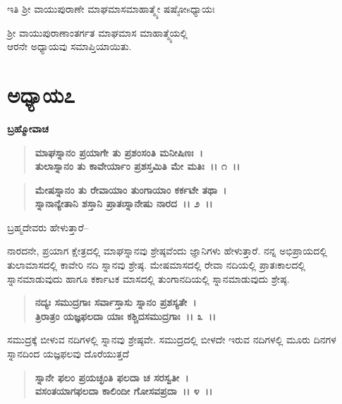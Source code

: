\begin{center}
ಇತಿ ಶ‍್ರೀ ವಾಯುಪುರಾಣೇ ಮಾಘಮಾಸಮಾಹಾತ್ಮ್ಯೇ ಷಷ್ಠೋsಧ್ಯಾಯಃ 
\end{center}

\begin{center}
ಶ‍್ರೀ ವಾಯುಪುರಾಣಾಂತರ್ಗತ ಮಾಘಮಾಸ ಮಾಹಾತ್ಮ್ಯೆಯಲ್ಲಿ \\ ಆರನೇ ಅಧ್ಯಾಯವು ಸಮಾಪ್ತಿಯಾಯಿತು.
\end{center}

\newpage

\section*{ಅಧ್ಯಾಯ೭}

\emptypage

\begin{flushleft}
\textbf{ಬ್ರಹ್ಮೋವಾಚ }
\end{flushleft}

\begin{verse}
\textbf{ಮಾಘಸ್ನಾನಂ ಪ್ರಯಾಗೇ ತು ಪ್ರಶಂಸಂತಿ ಮನೀಷಿಣಃ~।}\\\textbf{ತುಲಾಸ್ನಾನಂ ತು ಕಾವೇರ್ಯಾಂ ಪ್ರಶಸ್ತಮಿತಿ ಮೇ ಮತಿಃ~।। ೧~।। }
\end{verse}

\begin{verse}
\textbf{ಮೇಷಸ್ನಾನಂ ತು ರೇವಾಯಾಂ ತುಂಗಾಯಾಂ ಕರ್ಕಟೇ ತಥಾ~।}\\\textbf{ಸ್ನಾನಾನ್ಯೇತಾನಿ ಶಸ್ತಾನಿ ಪ್ರಾತಃಸ್ನಾನೇಷು ನಾರದ~।। ೨~।।}
\end{verse}

\begin{flushleft}
 ಬ್ರಹ್ಮದೇವರು ಹೇಳುತ್ತಾರೆ– 
\end{flushleft}

ನಾರದನೇ, ಪ್ರಯಾಗ ಕ್ಷೇತ್ರದಲ್ಲಿ ಮಾಘಸ್ನಾನವು ಶ್ರೇಷ್ಠವೆಂದು ಜ್ಞಾನಿಗಳು ಹೇಳುತ್ತಾರೆ. ನನ್ನ ಅಭಿಪ್ರಾಯದಲ್ಲಿ ತುಲಾಮಾಸದಲ್ಲಿ ಕಾವೇರಿ ನದಿ ಸ್ನಾನವು ಶ್ರೇಷ್ಠ. ಮೇಷಮಾಸದಲ್ಲಿ ರೇವಾ ನದಿಯಲ್ಲಿ ಪ್ರಾತಃಕಾಲದಲ್ಲಿ ಸ್ನಾನಮಾಡುವುದು ಹಾಗೂ ಕರ್ಕಾಟಕ ಮಾಸದಲ್ಲಿ ತುಂಗಾನದಿಯಲ್ಲಿ ಸ್ನಾನಮಾಡುವುದು ಶ್ರೇಷ್ಠ.

\begin{verse}
\textbf{ನದ್ಯಃ ಸಮುದ್ರಗಾಃ ಸರ್ವಾಸ್ತಾಸು ಸ್ನಾನಂ ಪ್ರಶಸ್ಯತೇ~।}\\\textbf{ತ್ರಿರಾತ್ರಂ ಯಜ್ಞಫಲದಾ ಯಾಃ ಕಶ್ಚಿದಸಮುದ್ರಗಾಃ~।। ೩~।। }
\end{verse}

ಸಮುದ್ರಕ್ಕೆ ಬೀಳುವ ನದಿಗಳಲ್ಲಿ ಸ್ನಾನವು ಶ್ರೇಷ್ಠವೇ. ಸಮುದ್ರದಲ್ಲಿ ಬೀಳದೇ ಇರುವ ನದಿಗಳಲ್ಲಿ ಮೂರು ದಿನಗಳ ಸ್ನಾನದಿಂದ ಯಜ್ಞಫಲವು ದೊರೆಯುತ್ತದೆ

\begin{verse}
\textbf{ಸ್ನಾನೇ ಫಲಂ ಪ್ರಯಚ್ಛಂತಿ ಫಲದಾ ಚ ಸರಸ್ವತೀ~।}\\\textbf{ವಸಂತಯಾಗಫಲದಾ ಕಾಲಿಂದೀ ಗೋಸವಪ್ರದಾ~।। ೪~।।} 
\end{verse}

